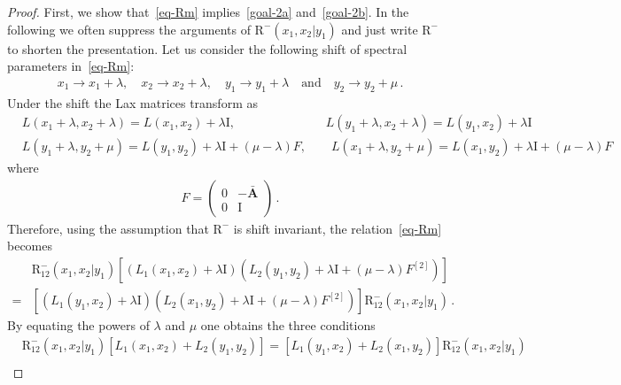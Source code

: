 \documentclass[10pt,a4paper]{amsart}
\newcommand{\ID}{\mathrm{I}}
\newcommand{\OAD}{\mathbf{\bar{A}}}
\newcommand{\abrOSCR}{\mathrm{R}}
\begin{document}
\begin{proof}
    
 First, we show that~\eqref{eq-Rm} implies~\eqref{goal-2a} and~\eqref{goal-2b}.
In the following we often suppress the arguments of $\abrOSCR^{-}(x_{1},x_{2}|y_{1})$ and just write $\abrOSCR^{-}$ to shorten the presentation.
Let us consider the following shift of spectral parameters in~\eqref{eq-Rm}:
\begin{equation}\label{variable-shift}
	\begin{split}
		x_{1}\to x_{1}+\lambda,\quad x_{2}\to x_{2}+\lambda,\quad y_{1}\to y_{1}+\lambda \quad \text{and}\quad y_{2}\to y_{2}+\mu\,.
	\end{split}
\end{equation}
Under the shift the Lax matrices  transform as
\begin{equation}
	\begin{split}
		&L(x_{1}+\lambda,x_{2}+\lambda)= L(x_{1},x_{2})+\lambda\ID,\;\quad\qquad\qquad\qquad L(y_{1}+\lambda,x_{2}+\lambda)= L(y_{1},x_{2})+\lambda \ID\\
		&L(y_{1}+\lambda,y_{2}+\mu)=L(y_{1},y_{2})+\lambda\ID+(\mu-\lambda)F,\qquad 	L(x_{1}+\lambda,y_{2}+\mu)= L(x_{1},y_{2})+\lambda\ID+(\mu-\lambda)F
	\end{split}
\end{equation}
where
						\begin{eqnarray}
	F=\begin{pmatrix}
		0&-\OAD\\
		0&\ID
	\end{pmatrix}\,.
\end{eqnarray}
Therefore, using the assumption that $\abrOSCR^{-}$ is shift invariant, the relation~\eqref{eq-Rm} becomes
\begin{equation}\label{consequence-shift-1}
	\begin{split}
		&\abrOSCR_{12}^{-}(x_1,x_2|y_1)\left[\left(L_{1}(x_{1},x_{2})+\lambda\ID\right)\left(L_{2}(y_{1},y_{2})+\lambda\ID+(\mu-\lambda)F^{[2]}\right)\right]\\
		=&
		\left[\left(L_{1}(y_{1},x_{2})+\lambda\ID\right)\left(L_{2}(x_{1},y_{2})+\lambda\ID+(\mu-\lambda)F^{[2]}\right)\right]\abrOSCR_{12}^{-}(x_1,x_2|y_1)\,.
	\end{split}
\end{equation}
By equating the powers of $\lambda$ and $\mu$ one obtains the three conditions
	\begin{align}
			&\abrOSCR_{12}^{-}(x_1,x_2|y_1)\left[L_{1}(x_{1},x_{2})+L_{2}(y_{1},y_{2})\right]=\left[L_{1}(y_{1},x_{2})+L_{2}(x_{1},y_{2})\right]\abrOSCR_{12}^{-}(x_1,x_2|y_1)\label{list-1-first}\\

\end{align}
\end{proof}
\end{document}
